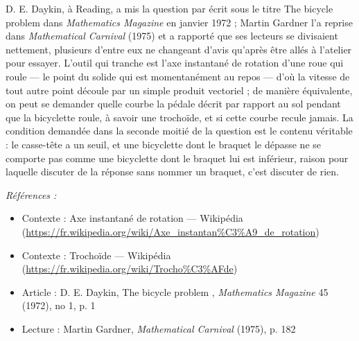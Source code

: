 \documentclass[11pt]{article}
\newenvironment{refs}{\par\small\noindent\emph{Références :}\begin{itemize}\setlength\itemsep{0pt}}{\end{itemize}\normalsize}
\begin{document}
\noindent D. E. Daykin, à Reading, a mis la question par écrit sous le titre \og{} The
bicycle problem \fg{} dans \textit{Mathematics Magazine} en janvier 1972 ; Martin Gardner l'a
reprise dans \textit{Mathematical Carnival} (1975) et a rapporté que ses lecteurs se
divisaient nettement, plusieurs d'entre eux ne changeant d'avis qu'après être allés à
l'atelier pour essayer. L'outil qui tranche est l'axe instantané de rotation d'une roue qui
roule --- le point du solide qui est momentanément au repos --- d'où la vitesse de tout autre
point découle par un simple produit vectoriel ; de manière équivalente, on peut se demander
quelle courbe la pédale décrit par rapport au sol pendant que la bicyclette roule, à savoir
une trochoïde, et si cette courbe recule jamais. La condition demandée dans la seconde
moitié de la question est le contenu véritable : le casse-tête a un seuil, et une bicyclette
dont le braquet le dépasse ne se comporte pas comme une bicyclette dont le braquet lui est
inférieur, raison pour laquelle discuter de \og{} la \fg{} réponse sans nommer un braquet, c'est
discuter de rien.

\begin{refs}
\item Contexte : Axe instantané de rotation --- Wikipédia (\url{https://fr.wikipedia.org/wiki/Axe_instantan%C3%A9_de_rotation})
\item Contexte : Trochoïde --- Wikipédia (\url{https://fr.wikipedia.org/wiki/Trocho%C3%AFde})
\item Article : D. E. Daykin, \og{} The bicycle problem \fg{}, \textit{Mathematics Magazine} 45 (1972), no 1, p. 1
\item Lecture : Martin Gardner, \textit{Mathematical Carnival} (1975), p. 182
\end{refs}

\bigskip
\end{document}

